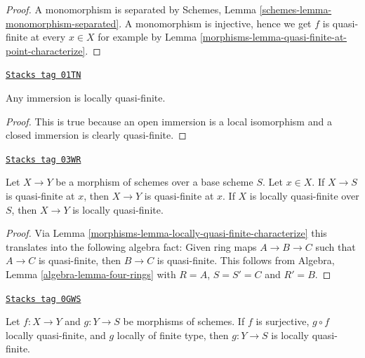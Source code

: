 \begin{proof}

A monomorphism is separated by Schemes, Lemma
\ref{schemes-lemma-monomorphism-separated}.
A monomorphism is injective, hence we get $f$
is quasi-finite at every $x \in X$ for example by
Lemma \ref{morphisms-lemma-quasi-finite-at-point-characterize}.
\end{proof}

\begin{lemma}
\label{morphisms-lemma-immersion-locally-quasi-finite}
\href{https://stacks.math.columbia.edu/tag/01TN}{\texttt{Stacks tag 01TN}}

Any immersion is locally quasi-finite.
\end{lemma}

\begin{proof}
This is true because an open immersion is a local isomorphism
and a closed immersion is clearly quasi-finite.
\end{proof}

\begin{lemma}
\label{morphisms-lemma-permanence-quasi-finite}
\href{https://stacks.math.columbia.edu/tag/03WR}{\texttt{Stacks tag 03WR}}

Let $X \to Y$ be a morphism of schemes over a base scheme $S$.
Let $x \in X$. If $X \to S$ is quasi-finite at $x$, then
$X \to Y$ is quasi-finite at $x$.
If $X$ is locally quasi-finite over $S$, then $X \to Y$
is locally quasi-finite.
\end{lemma}

\begin{proof}

Via Lemma \ref{morphisms-lemma-locally-quasi-finite-characterize} this translates
into the following algebra
fact: Given ring maps $A \to B \to C$ such that $A \to C$ is
quasi-finite, then $B \to C$ is quasi-finite.
This follows from
Algebra, Lemma \ref{algebra-lemma-four-rings}
with $R = A$, $S = S' = C$ and $R' = B$.
\end{proof}

\begin{lemma}
\label{morphisms-lemma-quasi-finite-local-source}
\href{https://stacks.math.columbia.edu/tag/0GWS}{\texttt{Stacks tag 0GWS}}

Let $f : X \to Y$ and $g : Y \to S$ be morphisms of schemes.
If $f$ is surjective, $g \circ f$ locally quasi-finite, and
$g$ locally of finite type, then $g : Y \to S$  is locally quasi-finite.
\end{lemma}

